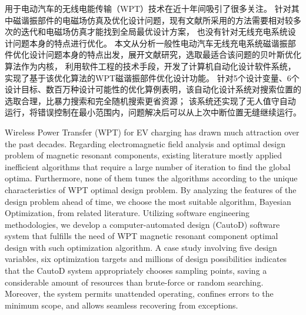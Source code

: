 \documentclass[degree=bachelor,tocarialchapter]{../thuthesis/thuthesis}
\begin{document}
\frontmatter

\begin{cabstract}
  用于电动汽车的无线电能传输（WPT）技术在近十年间吸引了很多关注。
  针对其中磁谐振部件的电磁场仿真及优化设计问题，现有文献所采用的方法需要相对较多次的迭代和电磁场仿真才能找到全局最优设计方案，
  也没有针对无线充电系统设计问题本身的特点进行优化。
  本文从分析一般性电动汽车无线充电系统磁谐振部件优化设计问题本身的特点出发，展开文献研究，选取最适合该问题的贝叶斯优化算法作为内核，
  利用软件工程的技术手段，开发了计算机自动化设计软件系统，实现了基于该优化算法的WPT磁谐振部件优化设计功能。
  针对5个设计变量、6个设计目标、数百万种设计可能性的优化算例表明，该自动化设计系统对搜索位置的选取合理，比暴力搜索和完全随机搜索更省资源；
  该系统还实现了无人值守自动运行，将错误控制在最小范围内，问题解决后可以从上次中断位置无缝继续运行。
\end{cabstract}

\begin{eabstract}
  Wireless Power Transfer (WPT) for EV charging has drawn much attraction over the past decades. Regarding electromagnetic field analysis and optimal design problem of magnetic resonant components, existing literature mostly applied inefficient algorithms that require a large number of iteration to find the global optima. Furthermore, none of them tunes the algorithms according to the unique characteristics of WPT optimal design problem. By analyzing the features of the design problem ahead of time, we choose the most suitable algorithm, Bayesian Optimization, from related literature. Utilizing software engineering methodologies, we develop a computer-automated design (CautoD) software system that fulfills the need of WPT magnetic resonant component optimal design with such optimization algorithm. A case study involving five design variables, six optimization targets and millions of design possibilities indicates that the CautoD system appropriately chooses sampling points, saving a considerable amount of resources than brute-force or random searching. Moreover, the system permits unattended operating, confines errors to the minimum scope, and allows seamless recovering from exceptions.
\end{eabstract}

\ifdefined\production
\else
  \makecover
\fi

\tableofcontents
\end{document}
